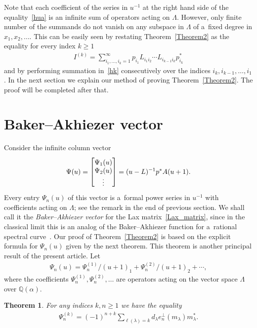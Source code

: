 \documentclass[11pt]{article}
\newtheorem{theorem}{Theorem}
\numberwithin{equation}{section}
\renewcommand\ge{\geqslant}
\begin{document}
Note that each coef\/f\/icient of the series in $u^{-1}$ at the right hand side of the
equality~\eqref{hua} is an inf\/inite sum of operators acting on $\Lambda$.
However, only f\/inite number of the summands do not vanish on any subspace in $\Lambda$ of a~f\/ixed
degree in $x_1,x_2,\ldots$.
This can be easily seen by restating Theorem~\ref{Theorem2} as the equality for every index $k\ge1$
\begin{gather}
\label{hk}
I^{(k)}=\sum_{i_1,\ldots,i_k=1}^\infty p_{i_1}
L_{i_1i_2}\cdots L_{i_{k-1}i_k}p^{\ast}_{i_k}
\end{gather}
and by performing summation in~\eqref{hk} consecutively over the indices $i_k,i_{k-1},\ldots,
i_1$.
In the next section we explain our method of proving Theorem~\ref{Theorem2}.
The proof will be completed after that.

\section[Baker-Akhiezer vector]{Baker--Akhiezer vector}\label{Section7}

Consider the inf\/inite column vector
\begin{gather}
\label{psiu}
\Psi(u)=
\begin{bmatrix}
\raisebox{0pt}[12pt][0pt]{$\Psi_1(u)$}
\\
\Psi_2(u)
\\
\vdots
\end{bmatrix}
=(u-L)^{-1}p^{\ast}A(u+1).
\end{gather}
Every entry $\Psi_n(u)$ of this vector is a~formal power series in $u^{-1}$ with coef\/f\/icients acting on
$\Lambda$; see the remark in the end of previous section.
We shall call it the \emph{Baker--Akhiezer vector} for the Lax matrix~\eqref{Lax_matrix}, since in the
classical limit this is an analog of the Baker--Akhiezer function for a~rational spectral curve~\cite{Skl}.
Our proof of Theorem~\ref{Theorem2} is based on the explicit formula for $\Psi_n(u)$ given by the next theorem.
This theorem is another principal result of the present article.
Let
\begin{gather*}
\Psi_n(u)=\Psi^{(1)}_n/(u+1)_1+\Psi^{(2)}_n/(u+1)_2+\cdots,
\end{gather*}
where the coef\/f\/icients $\Psi^{(1)}_n,\Psi^{(2)}_n,\ldots$ are operators
acting on the vector space $\Lambda$ over $\mathbb Q(\alpha)$.
\begin{theorem}\label{Theorem3}
For any indices $k,n\ge1$ we have the equality
\begin{gather}
\label{psink}
\Psi^{(k)}_n=(-1)^{n+k}\sum_{\ell(\lambda)=k}d_\lambda e_n^{
\perp}(m_\lambda)m_\lambda^{\ast}.
\end{gather}
\end{theorem}
\end{document}
